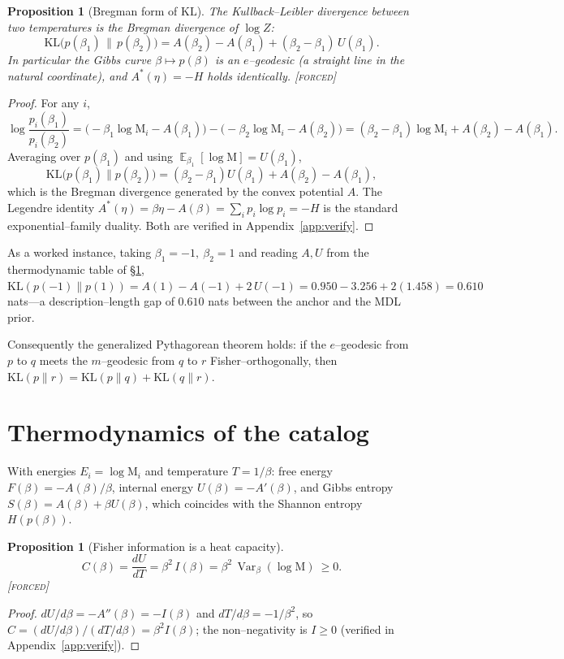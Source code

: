 \documentclass[11pt]{article}
\newtheorem{proposition}[theorem]{Proposition}
\theoremstyle{definition}
\newcommand{\Mah}{\mathrm{M}}
\newcommand{\Var}{\operatorname{Var}}
\newcommand{\E}{\operatorname{\mathbb{E}}}
\newcommand{\forcedtag}{{\scshape [forced]}}
\begin{document}
\begin{proposition}[Bregman form of $\mathrm{KL}$]\label{prop:bregman}
The Kullback--Leibler divergence between two temperatures is the Bregman divergence of $\log Z$:
\[
\mathrm{KL}\!\big(p(\beta_1)\,\|\,p(\beta_2)\big)=A(\beta_2)-A(\beta_1)+(\beta_2-\beta_1)\,U(\beta_1).
\]
In particular the Gibbs curve $\beta\mapsto p(\beta)$ is an $e$--geodesic (a straight line in the
natural coordinate), and $A^\ast(\eta)=-H$ holds identically. \forcedtag
\end{proposition}
\begin{proof}
For any $i$,
\[
\log\frac{p_i(\beta_1)}{p_i(\beta_2)}
=\big(-\beta_1\log\Mah_i-A(\beta_1)\big)-\big(-\beta_2\log\Mah_i-A(\beta_2)\big)
=(\beta_2-\beta_1)\log\Mah_i+A(\beta_2)-A(\beta_1).
\]
Averaging over $p(\beta_1)$ and using $\E_{\beta_1}[\log\Mah]=U(\beta_1)$,
\[
\mathrm{KL}\big(p(\beta_1)\|p(\beta_2)\big)
=(\beta_2-\beta_1)U(\beta_1)+A(\beta_2)-A(\beta_1),
\]
which is the Bregman divergence generated by the convex potential $A$. The Legendre identity
$A^\ast(\eta)=\beta\eta-A(\beta)=\sum_i p_i\log p_i=-H$ is the standard exponential--family duality.
Both are verified in Appendix~\ref{app:verify}.
\end{proof}

As a worked instance, taking $\beta_1=-1,\ \beta_2=1$ and reading $A,U$ from the thermodynamic table
of \S\ref{sec:thermo}, $\mathrm{KL}(p(-1)\|p(1))=A(1)-A(-1)+2\,U(-1)=0.950-3.256+2(1.458)=0.610$
nats---a description--length gap of $0.610$ nats between the anchor and the MDL prior.

Consequently the generalized Pythagorean theorem holds: if the $e$--geodesic from $p$ to $q$ meets
the $m$--geodesic from $q$ to $r$ Fisher--orthogonally, then
$\mathrm{KL}(p\|r)=\mathrm{KL}(p\|q)+\mathrm{KL}(q\|r)$.

\section{Thermodynamics of the catalog}\label{sec:thermo}
With energies $E_i=\log\Mah_i$ and temperature $T=1/\beta$: free energy $F(\beta)=-A(\beta)/\beta$,
internal energy $U(\beta)=-A'(\beta)$, and Gibbs entropy $S(\beta)=A(\beta)+\beta U(\beta)$, which
coincides with the Shannon entropy $H(p(\beta))$.

\begin{proposition}[Fisher information is a heat capacity]\label{prop:heat}
\[
C(\beta)=\frac{dU}{dT}=\beta^2\,I(\beta)=\beta^2\,\Var_\beta(\log\Mah)\ \ge 0 .
\]
\forcedtag
\end{proposition}
\begin{proof}
$dU/d\beta=-A''(\beta)=-I(\beta)$ and $dT/d\beta=-1/\beta^2$, so
$C=(dU/d\beta)/(dT/d\beta)=\beta^2 I(\beta)$; the non--negativity is $I\ge0$ (verified in
Appendix~\ref{app:verify}).
\end{proof}
\end{document}
